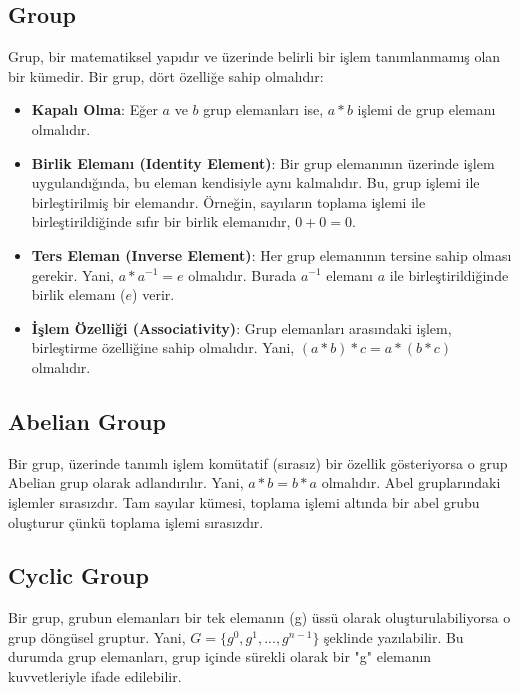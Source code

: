 \newpage

\subsection{Group}

Grup, bir matematiksel yapıdır ve üzerinde belirli bir işlem tanımlanmamış olan bir kümedir. Bir grup, dört özelliğe sahip olmalıdır:

\begin{itemize}
    \item \textbf{Kapalı Olma}: Eğer $a$ ve $b$ grup elemanları ise, $a * b$ işlemi de grup elemanı olmalıdır.
    \item \textbf{Birlik Elemanı (Identity Element)}: Bir grup elemanının üzerinde işlem uygulandığında, bu eleman kendisiyle aynı kalmalıdır. Bu, grup işlemi ile birleştirilmiş bir elemandır. Örneğin, sayıların toplama işlemi ile birleştirildiğinde sıfır bir birlik elemanıdır, $0 + 0 = 0$.
    \item \textbf{Ters Eleman (Inverse Element)}: Her grup elemanının tersine sahip olması gerekir. Yani, $a * a^{-1} = e$ olmalıdır. Burada $a^{-1}$ elemanı $a$ ile birleştirildiğinde birlik elemanı ($e$) verir.
    \item \textbf{İşlem Özelliği (Associativity)}: Grup elemanları arasındaki işlem, birleştirme özelliğine sahip olmalıdır. Yani, $(a * b) * c = a * (b * c)$ olmalıdır.
\end{itemize}

\newpage

\subsection{Abelian Group}

Bir grup, üzerinde tanımlı işlem komütatif (sırasız) bir özellik gösteriyorsa o grup Abelian grup olarak adlandırılır. Yani, $a * b = b * a$ olmalıdır. Abel gruplarındaki işlemler sırasızdır. Tam sayılar kümesi, toplama işlemi altında bir abel grubu oluşturur çünkü toplama işlemi sırasızdır.

\newpage

\subsection{Cyclic Group}

Bir grup, grubun elemanları bir tek elemanın (g) üssü olarak oluşturulabiliyorsa o grup döngüsel gruptur. Yani, $G = \{ g^0, g^1, ..., g^{n-1} \}$ şeklinde yazılabilir. Bu durumda grup elemanları, grup içinde sürekli olarak bir "g" elemanın kuvvetleriyle ifade edilebilir.

